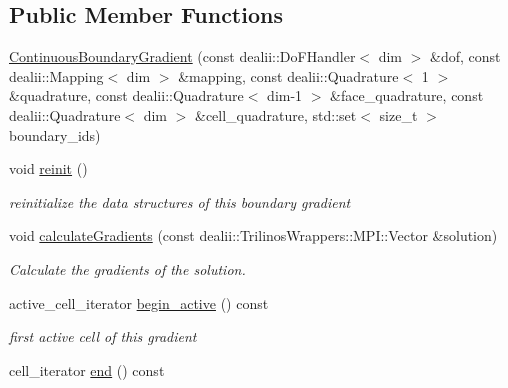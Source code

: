 \subsection*{Public Member Functions}
\begin{DoxyCompactItemize}
\item 
\hyperlink{classnatrium_1_1ContinuousBoundaryGradient_a50ea3e2b4baedabcca7514d3f7dddda7}{ContinuousBoundaryGradient} (const dealii::DoFHandler$<$ dim $>$ \&dof, const dealii::Mapping$<$ dim $>$ \&mapping, const dealii::Quadrature$<$ 1 $>$ \&quadrature, const dealii::Quadrature$<$ dim-\/1 $>$ \&face\_\-quadrature, const dealii::Quadrature$<$ dim $>$ \&cell\_\-quadrature, std::set$<$ size\_\-t $>$ boundary\_\-ids)
\item 
\hypertarget{classnatrium_1_1ContinuousBoundaryGradient_a0f121ef55710aaee77d070d5d31839f1}{
void \hyperlink{classnatrium_1_1ContinuousBoundaryGradient_a0f121ef55710aaee77d070d5d31839f1}{reinit} ()}
\label{classnatrium_1_1ContinuousBoundaryGradient_a0f121ef55710aaee77d070d5d31839f1}

\begin{DoxyCompactList}\small\item\em reinitialize the data structures of this boundary gradient \item\end{DoxyCompactList}\item 
\hypertarget{classnatrium_1_1ContinuousBoundaryGradient_a0ac7cad2865e491d0c77863ce9b2061a}{
void \hyperlink{classnatrium_1_1ContinuousBoundaryGradient_a0ac7cad2865e491d0c77863ce9b2061a}{calculateGradients} (const dealii::TrilinosWrappers::MPI::Vector \&solution)}
\label{classnatrium_1_1ContinuousBoundaryGradient_a0ac7cad2865e491d0c77863ce9b2061a}

\begin{DoxyCompactList}\small\item\em Calculate the gradients of the solution. \item\end{DoxyCompactList}\item 
\hypertarget{classnatrium_1_1ContinuousBoundaryGradient_aeb8d2aa8290ea70e51f4904573541a8f}{
active\_\-cell\_\-iterator \hyperlink{classnatrium_1_1ContinuousBoundaryGradient_aeb8d2aa8290ea70e51f4904573541a8f}{begin\_\-active} () const }
\label{classnatrium_1_1ContinuousBoundaryGradient_aeb8d2aa8290ea70e51f4904573541a8f}

\begin{DoxyCompactList}\small\item\em first active cell of this gradient \item\end{DoxyCompactList}\item 
\hypertarget{classnatrium_1_1ContinuousBoundaryGradient_a80dc48096381a481f688c75dace6a3b7}{
cell\_\-iterator \hyperlink{classnatrium_1_1ContinuousBoundaryGradient_a80dc48096381a481f688c75dace6a3b7}{end} () const }
\label{classnatrium_1_1ContinuousBoundaryGradient_a80dc48096381a481f688c75dace6a3b7}


\end{DoxyCompactItemize}
